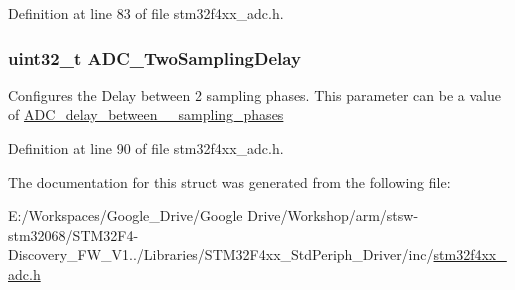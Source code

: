 Definition at line 83 of file stm32f4xx\-\_\-adc.\-h.

\hypertarget{struct_a_d_c___common_init_type_def_a27777b706ee9a544ffbac66eefcf952a}{
\subsubsection[{A\-D\-C\-\_\-\-Two\-Sampling\-Delay}]{\setlength{\rightskip}{0pt plus 5cm}uint32\-\_\-t A\-D\-C\-\_\-\-Two\-Sampling\-Delay}}\label{struct_a_d_c___common_init_type_def_a27777b706ee9a544ffbac66eefcf952a}
Configures the Delay between 2 sampling phases. This parameter can be a value of \hyperlink{group___a_d_c__delay__between__2__sampling__phases}{A\-D\-C\-\_\-delay\-\_\-between\-\_\-\_\-sampling\-\_\-phases} 

Definition at line 90 of file stm32f4xx\-\_\-adc.\-h.



The documentation for this struct was generated from the following file\-:\begin{DoxyCompactItemize}
\item 
E\-:/\-Workspaces/\-Google\-\_\-\-Drive/\-Google Drive/\-Workshop/arm/stsw-\/stm32068/\-S\-T\-M32\-F4-\/\-Discovery\-\_\-\-F\-W\-\_\-\-V1../\-Libraries/\-S\-T\-M32\-F4xx\-\_\-\-Std\-Periph\-\_\-\-Driver/inc/\hyperlink{stm32f4xx__adc_8h}{stm32f4xx\-\_\-adc.\-h}\end{DoxyCompactItemize}
